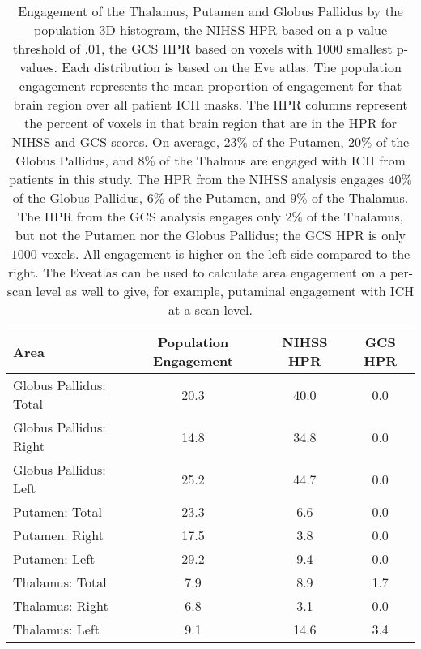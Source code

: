 \begin{table}[ht]
\centering
\begin{tabular}{lccc}
  \hline
Area & Population Engagement & NIHSS HPR & GCS HPR \\ 
  \hline
Globus Pallidus: Total & 20.3 & 40.0 & 0.0 \\ 
  Globus Pallidus: Right & 14.8 & 34.8 & 0.0 \\ 
  Globus Pallidus: Left & 25.2 & 44.7 & 0.0 \\ 
  Putamen: Total & 23.3 & 6.6 & 0.0 \\ 
  Putamen: Right & 17.5 & 3.8 & 0.0 \\ 
  Putamen: Left & 29.2 & 9.4 & 0.0 \\ 
  Thalamus: Total & 7.9 & 8.9 & 1.7 \\ 
  Thalamus: Right & 6.8 & 3.1 & 0.0 \\ 
  Thalamus: Left & 9.1 & 14.6 & 3.4 \\ 
   \hline
\end{tabular}
\caption{Engagement of the Thalamus, Putamen and Globus Pallidus by the population  3D histogram, the NIHSS HPR based on a p-value  threshold of $.01$, the GCS HPR based on voxels with $1000$ smallest p-values.  Each distribution  is based on the Eve atlas.  The population engagement represents the mean proportion of engagement for that brain region over all patient ICH masks.  The HPR columns represent the percent of voxels in that brain region that  are in the HPR for NIHSS and GCS scores.   On average, $23\%$ of the Putamen, $20\%$ of the Globus Pallidus, and $8\%$ of the Thalmus are  engaged with ICH from patients in this study.  The HPR from the NIHSS analysis engages $40\%$ of the Globus Pallidus, $6\%$ of the Putamen, and $9\%$ of the Thalamus.  The HPR from the GCS analysis engages only $2\%$ of the Thalamus, but not the Putamen nor the Globus Pallidus; the GCS HPR is only $1000$ voxels.  All engagement is higher on the left side compared to the right. The Eveatlas can be used to calculate area engagement on a per-scan level as well to give, for example, putaminal engagement with ICH at a scan level. } 
\label{t:area_breakdown}
\end{table}
